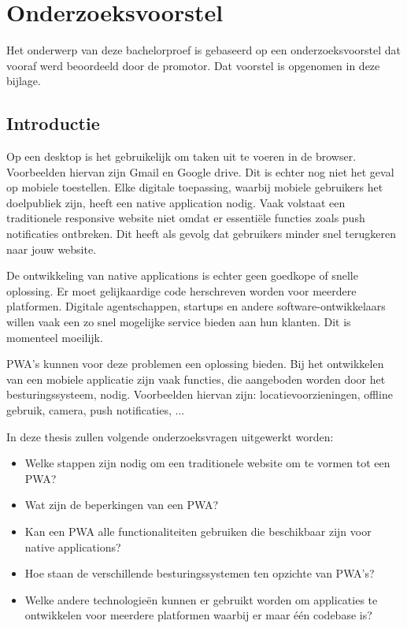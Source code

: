 \chapter{Onderzoeksvoorstel}
Het onderwerp van deze bachelorproef is gebaseerd op een onderzoeksvoorstel dat vooraf werd beoordeeld door de promotor. Dat voorstel is opgenomen in deze bijlage.

\section{Introductie} %
\label{sec:introductie}

Op een desktop is het gebruikelijk om taken uit te voeren in de browser. Voorbeelden hiervan zijn Gmail en Google drive. Dit is echter nog niet het geval op mobiele toestellen.
Elke digitale toepassing, waarbij mobiele gebruikers het doelpubliek zijn, heeft een native application nodig. Vaak volstaat een traditionele responsive website niet omdat er essentiële functies zoals push notificaties ontbreken. Dit heeft als gevolg dat gebruikers minder snel terugkeren naar jouw website.
\autocite{Hiltunen2018}

De ontwikkeling van native applications is echter geen goedkope of snelle oplossing. Er moet gelijkaardige code herschreven worden voor meerdere platformen. Digitale agentschappen, startups en andere software-ontwikkelaars willen vaak een zo snel mogelijke service bieden aan hun klanten. Dit is momenteel moeilijk.

PWA's kunnen voor deze problemen een oplossing bieden.
Bij het ontwikkelen van een mobiele applicatie zijn vaak functies, die aangeboden worden door het besturingssysteem, nodig. Voorbeelden hiervan zijn: locatievoorzieningen, offline gebruik, camera, push notificaties, ...

In deze thesis zullen volgende onderzoeksvragen uitgewerkt worden:
\begin{itemize}
    \item Welke stappen zijn nodig om een traditionele website om te vormen tot een PWA?
    \item Wat zijn de beperkingen van een PWA?
    \item Kan een PWA alle functionaliteiten gebruiken die beschikbaar zijn voor native applications?
    \item Hoe staan de verschillende besturingssystemen ten opzichte van PWA's?
    \item Welke andere technologieën kunnen er gebruikt worden om applicaties te ontwikkelen voor meerdere platformen waarbij er maar één codebase is?
\end{itemize}

